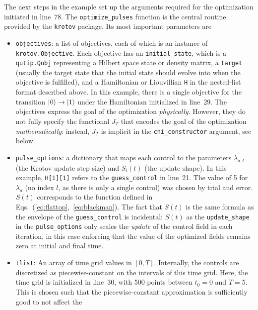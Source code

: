 \documentclass[submission, Phys]{SciPost}
\begin{document}
The next steps in the example set up the arguments required for the optimization
initiated in line~78.
The \texttt{optimize\_pulses} function is the central routine provided by the
\texttt{krotov} package.
Its most important parameters are
\begin{itemize}
    \item \texttt{objectives}: a list of objectives, each of which is an
      instance of \texttt{krotov.Objective}. Each objective has an
      \texttt{initial\_state}, which is a \texttt{qutip.Qobj} representing
      a Hilbert space state or density matrix, a \texttt{target} (usually the
      target state that the initial state should evolve into when the objective
      is fulfilled), and a Hamiltonian or Liouvillian \texttt{H} in the
      nested-list format described above. In this example, there is a single
      objective for the transition $\ket{0} \rightarrow \ket{1}$ under the
      Hamiltonian initialized in line~29. The objectives express the goal of the
      optimization \emph{physically}. However, they do not fully specify the
      functional $J_T$ that encodes the goal of the optimization
      \emph{mathematically}: instead, $J_T$ is implicit in the
      \texttt{chi\_constructor} argument, see below.
    \item \texttt{pulse\_options}: a dictionary that maps each control to the
      parameters $\lambda_{a,l}$ (the Krotov update step size) and $S_l(t)$ (the
      update shape). In this example, \texttt{H[1][1]} refers to the
      \texttt{guess\_control} in line~21. The value of 5 for $\lambda_a$
      (no index $l$, as there is only a single control) was chosen by trial
      and error. $S(t)$ corresponds to the function defined in
      Eqs.~(\ref{eq:flattop},~\ref{eq:blackman}). The fact that $S(t)$ is the
      same formula as the envelope of the \texttt{guess\_control} is
      incidental: $S(t)$ as the \texttt{update\_shape} in the
      \texttt{pulse\_options} only scales the \emph{update} of the control field
      in each iteration, in this case enforcing that the value of the optimized
      fields remains zero at initial and final time.
    \item \texttt{tlist}: An array of time grid values in $[0, T]$. Internally,
      the controls are discretized as piecewise-constant on the intervals of
      this time grid. Here, the time grid is initialized in line~30, with 500
      points between $t_0 = 0$ and $T = 5$. This is chosen such that the
      piecewise-constant approximation is sufficiently good to not affect the

\end{itemize}
\end{document}
